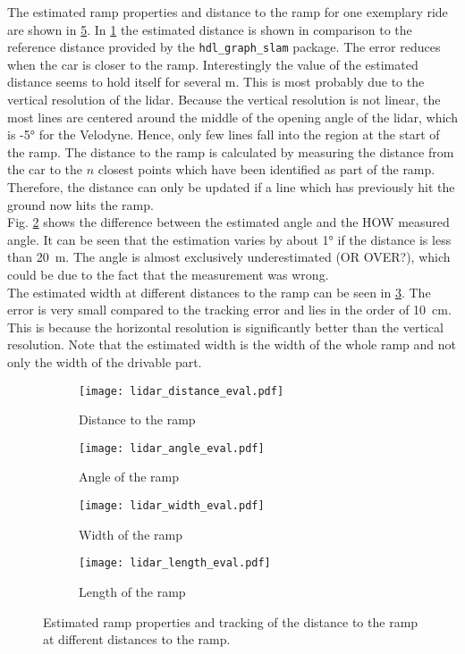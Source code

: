 The estimated ramp properties and distance to the ramp for one exemplary ride are shown in \cref{fig:lidar_eval}.
In \cref{fig:lidar_distance_eval} the estimated distance is shown in comparison to the reference distance provided by the \texttt{hdl\_graph\_slam} package.
The error reduces when the car is closer to the ramp.
Interestingly the value of the estimated distance seems to hold itself for several \si{\metre}.
This is most probably due to the vertical resolution of the \gls{lidar}.
Because the vertical resolution is not linear, the most lines are centered around the middle of the opening angle of the \gls{lidar}, which is -\ang{5} for the Velodyne.
Hence, only few lines fall into the region at the start of the ramp.
The distance to the ramp is calculated by measuring the distance from the car to the $n$ closest points which have been identified as part of the ramp.
Therefore, the distance can only be updated if a line which has previously hit the ground now hits the ramp.\\
Fig. \ref{fig:lidar_angle_eval} shows the difference between the estimated angle and the HOW measured angle.
It can be seen that the estimation varies by about \ang{1} if the distance is less than \SI{20}{\metre}.
The angle is almost exclusively underestimated (OR OVER?), which could be due to the fact that the measurement was wrong.\\
The estimated width at different distances to the ramp can be seen in \cref{fig:lidar_width_eval}.
The error is very small compared to the tracking error and lies in the order of \SI{10}{\cm}.
This is because the horizontal resolution is significantly better than the vertical resolution.
Note that the estimated width is the width of the whole ramp and not only the width of the drivable part.\\
\begin{figure}[htb]
	\centering
	\begin{subfigure}{1\textwidth}
		\centering
		\texttt{[image: lidar\_distance\_eval.pdf]}
		\caption{Distance to the ramp}
		\label{fig:lidar_distance_eval}
	\end{subfigure}
	
	\begin{subfigure}{1\textwidth}
		\centering
		\texttt{[image: lidar\_angle\_eval.pdf]}
		\caption{Angle of the ramp}
		\label{fig:lidar_angle_eval}
	\end{subfigure}
	
	\begin{subfigure}{1\textwidth}
		\centering
		\texttt{[image: lidar\_width\_eval.pdf]}
		\caption{Width of the ramp}
		\label{fig:lidar_width_eval}
	\end{subfigure}
	
	\begin{subfigure}{1\textwidth}
		\centering
		\texttt{[image: lidar\_length\_eval.pdf]}
		\caption{Length of the ramp}
		\label{fig:lidar_length_eval}
	\end{subfigure}
	\caption{Estimated ramp properties and tracking of the distance to the ramp at different distances to the ramp.}
	\label{fig:lidar_eval}
\end{figure}
